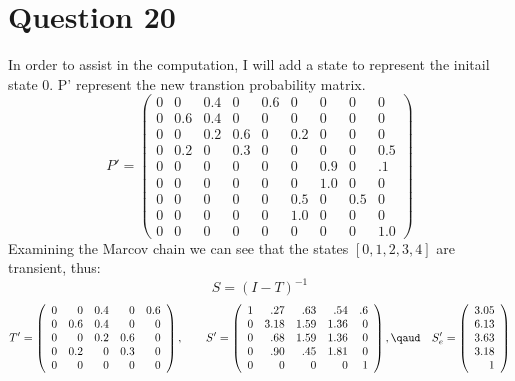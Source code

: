 \documentclass{article}
\begin{document}
  \section*{Question 20}
  In order to assist in the computation, I will add a state to represent the
  initail state 0. P' represent the new transtion probability matrix.
   \[ P' =\left(
  \begin{array}{rrrrrrrrr}
  0 & 0  & 0.4 & 0  & 0.6 & 0   & 0   & 0  & 0  \\
  0 & 0.6 & 0.4 & 0  & 0 & 0   & 0   & 0  & 0  \\
  0 & 0  & 0.2 & 0.6 & 0 & 0.2  & 0   & 0  & 0  \\
  0 & 0.2 & 0   & 0.3 & 0 & 0   & 0   & 0  & 0.5 \\
  0 & 0  & 0   & 0  & 0 & 0   & 0.9  & 0  & .1 \\
  0 & 0  & 0   & 0  & 0 & 0   & 1.0 &  0 & 0  \\
  0 & 0  & 0   & 0  & 0 & 0.5  & 0   & 0.5 & 0  \\
  0 & 0  & 0   & 0  & 0 & 1.0 & 0   & 0  & 0  \\
  0 & 0  & 0   & 0  & 0 & 0   & 0   & 0  & 1.0
  \end{array}\right)\]
  Examining the Marcov chain we can see that the states $[0,1,2,3,4]$ are
  transient, thus:
  \[S = (I - T)^{-1}\]
   \[ T' =\left(\begin{array}{rrrrr}
  0 & 0   & 0.4 & 0   & 0.6  \\
  0 & 0.6 & 0.4 & 0   & 0    \\
  0 & 0   & 0.2 & 0.6 & 0    \\
  0 & 0.2 & 0   & 0.3 & 0    \\
  0 & 0   & 0   & 0   & 0   
  \end{array}\right), \quad \quad S'= \left(\begin{array}{rrrrr}
   1 & .27 & .63 & .54 & .6 \\
   0 & 3.18 & 1.59 & 1.36 & 0 \\
   0 & .68 & 1.59 & 1.36 & 0 \\
   0 & .90 & .45 & 1.81 & 0 \\
   0 & 0 & 0 & 0 & 1
  \end{array}\right),\qaud \quad S'_e = \left(\begin{array}{r}
   3.05\\
   6.13\\
   3.63\\
   3.18\\
   1 \end{array}\right)\]
\end{document}
